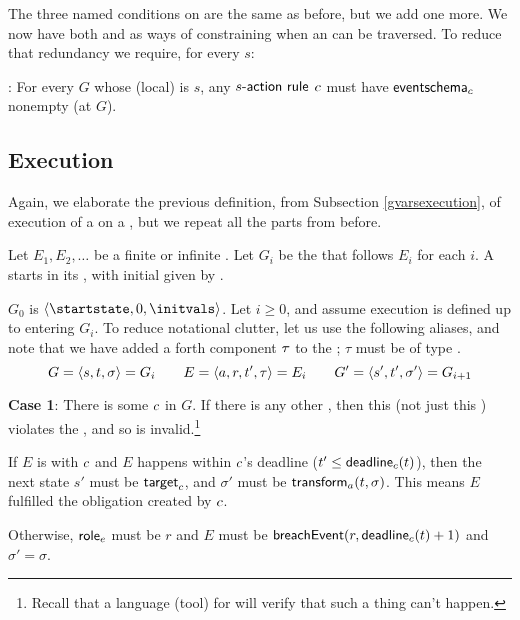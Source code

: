 \documentclass[12pt]{article}
\begin{document}
The three named conditions on \TGuards are the same as before, but we add one more. We now have both \EventSchema and \TGuards as ways of constraining when an \actionrule can be traversed. To reduce that redundancy we require, for every \State $s$:

\noindent {}: For every \GlobalState $G$ whose (local) \State is $s$, any \enabled $s\textsf{-{action rule}}$ $c$ must have $\textsf{eventschema}_{c}$ nonempty (at $G$).
\medskip

\subsection{Execution} \label{schemasexecution}

Again, we elaborate the previous definition, from Subsection \ref{gvarsexecution}, of execution of a \Contract on a \trace, but we repeat all the parts from before.

\medskip

Let $E_1, E_2, \dots$ be a finite or infinite \trace. Let $G_i$ be the \GlobalState that follows $E_i$ for each $i$. A \Contract starts in its \startstate, with initial \gvarsassign given by \initvals.

$G_0$ is $\tup{\startstate, 0, \initvals}$.
Let $i \geq 0$, and assume execution is defined up to entering $G_i$. To reduce notational clutter, let us use the following aliases, and note that we have added a forth component $\tau$ to the \Event; $\tau$ must be of type .
\[ G = \langle s,t,\sigma\rangle = G_i  \qquad E = \langle a,r,t',\tau\rangle =  E_i \qquad  G' = \langle s',t', \sigma'\rangle = G_{i+1}\]

{\bf Case 1}: There is some \enabled \mustnarule $c$ in $G$. If there is any other \enabled \actionrule, then this \Contract (not just this \trace) violates the \uaocz, and so is invalid.\footnote{Recall that a language (tool) for \Contracts will verify that such a thing can't happen.}
\begin{PPI}
    \item If $E$ is \compatible with $c$ and $E$ happens within $c$'s deadline ($t' \leq \textsf{deadline}_{c}(t)$), then the next state $s'$ must be $\textsf{target}_{c}$, and $\sigma'$ must be $\textsf{transform}_{a}(t,\sigma)$. This means $E$ fulfilled the obligation created by $c$.
    \item Otherwise, $\textsf{role}_{e}$ must be $r$ and $E$ must be $\textsf{breachEvent}(r,\textsf{deadline}_{c}(t) + 1)$ and $\sigma' = \sigma$. %
\end{PPI}
\end{document}
